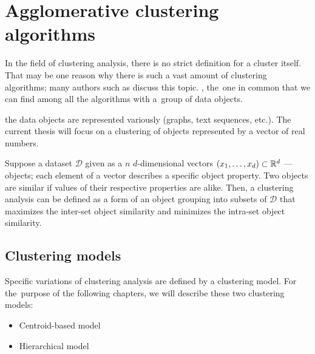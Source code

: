 \chapter{Agglomerative clustering algorithms}

In the field of clustering analysis, there is no strict definition for a cluster itself. That may be one reason why there is such a vast amount of clustering algorithms; many authors such as \citet{estivill2002so} discuss this topic.  , the~one  in common that we can find among all the algorithms  with a~group of data objects.

 the data objects are represented variously (graphs, text sequences, etc.). The current thesis will focus on a clustering of objects represented by a vector of real numbers.

Suppose a dataset $\mathcal{D}$ given as a $n$ $d$-dimensional vectors $(x_1,\dots,x_d) \subset \mathbb{R}^d$  --- objects; each element of a vector describes a specific object property. Two objects are similar if values of their respective properties are alike. Then, a clustering analysis can be defined as a form of an object grouping into subsets of $\mathcal{D}$ that maximizes the inter-set object similarity and minimizes the intra-set object similarity.

\section{Clustering models}

Specific variations of clustering analysis are defined by a clustering model. For the~purpose of the following chapters, we will describe these two clustering models:
\begin{itemize}
	\item Centroid-based model
	\item Hierarchical model
\end{itemize}


